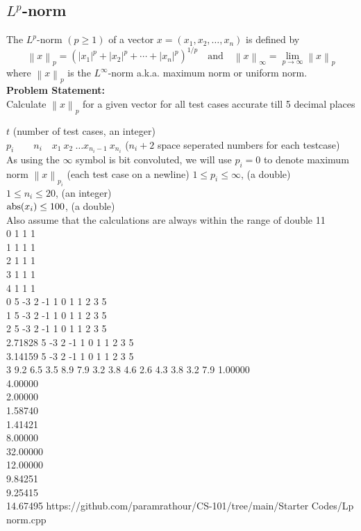 \documentclass[../Problems]{subfiles}
\begin{document}
\subsection{$L^p$-norm}
The $L^p$-norm $(p\geq1)$ of a vector $x = (x_1, x_2,\ldots, x_n)$ is defined by
\begin{equation}
{\displaystyle \left\|x\right\|_{p}=\left(|x_{1}|^{p}+|x_{2}|^{p}+\dotsb +|x_{n}|^{p}\right)^{1/p}\quad\text{and}\quad \left\|x\right\|_{\infty}=\displaystyle\lim_{p\rightarrow\infty}\left\|x\right\|_{p}}
\end{equation}
where $\left\|x\right\|_{p}$ is the $L^\infty$-norm a.k.a. maximum norm or uniform norm.\\
\textbf{Problem Statement:}\\
Calculate $\left\|x\right\|_p$ for a given vector for all test cases accurate till 5 decimal places
\begin{testcases}
	{$t$ \hfill(number of test cases, an integer)\\
	$p_i\qquad n_i\quad x_1\ x_2\ \ldots x_{n_i-1}\ x_{n_i}$ \hfill($n_i+2$ space seperated numbers for each testcase)\\
	As using the $\infty$ symbol is bit convoluted, we will use $p_i = 0$ to denote maximum norm}
	{$\left\|x\right\|_{p_i}$ \hfill{(each test case on a newline)}}
	{$1 \leq p_i \leq \infty$, \hfill{(a double)}\\
	$1 \leq n_i \leq 20$, \hfill{(an integer)}\\
	$\operatorname{abs}(x_i) \leq 100$, \hfill{(a double)}\\
	Also assume that the calculations are always within the range of double}
	{11\\0 1 1 1\\1 1 1 1\\2 1 1 1\\3 1 1 1\\4 1 1 1\\0 5 -3 2 -1 1 0 1 1 2 3 5\\1 5 -3 2 -1 1 0 1 1 2 3 5\\2 5 -3 2 -1 1 0 1 1 2 3 5\\2.71828 5 -3 2 -1 1 0 1 1 2 3 5\\3.14159 5 -3 2 -1 1 0 1 1 2 3 5\\3 9.2 6.5 3.5 8.9 7.9 3.2 3.8 4.6 2.6 4.3 3.8 3.2 7.9}
	{1.00000\\4.00000\\2.00000\\1.58740\\1.41421\\8.00000\\32.00000\\12.00000\\9.84251\\9.25415\\14.67495}
	{https://github.com/paramrathour/CS-101/tree/main/Starter Codes/Lp norm.cpp}
\end{testcases}
\end{document}
